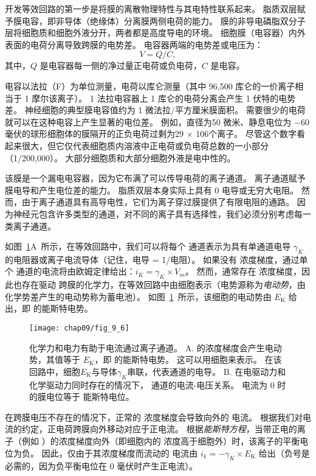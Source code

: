 开发等效回路的第一步是将膜的离散物理特性与其电特性联系起来。
脂质双层赋予膜电容，即非导体（绝缘体）分离膜两侧电荷的能力。
膜的非导电磷脂双分子层将细胞质和细胞外液分开，两者都是高度导电的环境。
细胞膜（电容器）内外表面的电荷分离导致跨膜的电势差。
电容器两端的电势差或电压为：
\begin{equation}
	V = Q/C,
\end{equation}
其中，$Q$ 是电容器每一侧的净过量正电荷或负电荷，$C$ 是电容。


电容以法拉（F）为单位测量，电荷以库仑测量（其中 96,500 库仑的一价离子相当于 1 摩尔该离子）。
1 法拉电容器上 1 库仑的电荷分离会产生 1 伏特的电势差。
神经细胞的典型膜电容值约为 1 微法拉/平方厘米膜面积。
需要很少的电荷就可以在这种电容上产生显著的电位差。 
例如，直径为50 微米、静息电位为 −60 毫伏的球形细胞体的膜隔开的正负电荷过剩为29 $\times$ 106个离子。
尽管这个数字看起来很大，但它仅代表细胞质内溶液中正电荷或负电荷总数的一小部分（1/200,000）。
大部分细胞质和大部分细胞外液是电中性的。


该膜是一个漏电电容器，因为它布满了可以传导电荷的离子通道。
离子通道赋予膜电导和产生电位差的能力。
脂质双层本身实际上具有 0 电导或无穷大电阻。
然而，由于离子通道具有高导电性，它们为离子穿过膜提供了有限电阻的通路。
因为神经元包含许多类型的通道，对不同的离子具有选择性，我们必须分别考虑每一类离子通道。


如图~\ref{fig:9_6}A~所示，在等效回路中，我们可以将每个  通道表示为具有单通道电导 $\gamma_K$ 的电阻器或离子电流导体（记住，电导 = 1/电阻）。 
如果没有  浓度梯度，通过单个  通道的电流将由欧姆定律给出：$i_K = \gamma_K \times V_m$。
然而，通常存在  浓度梯度，因此也存在驱动  跨膜的化学力，在等效回路中由细胞表示（电势源称为\textit{电动势}，由化学势差产生的电动势称为蓄电池）。
如图~\ref{fig:9_6}~所示，该细胞的电动势由 $E_\text{K}$ 给出，即  的能斯特电势。


\begin{figure}[htbp]
	\centering
	\texttt{[image: chap09/fig\_9\_6]}
	\caption{化学力和电力有助于电流通过离子通道。
		A.  的浓度梯度会产生电动势，其值等于 $E_\text{K}$，即  的能斯特电势。
		这可以用细胞来表示。
		在该回路中，细胞$E_\text{K}$与导体$\gamma_K$串联，代表通道的电导。
		B. 在电驱动力和化学驱动力同时存在的情况下， 通道的电流-电压关系。
		电流为 0 时的膜电位等于  能斯特电位。}
	\label{fig:9_6}
\end{figure}


在跨膜电压不存在的情况下，正常的  浓度梯度会导致向外的  电流。
根据我们对电流的约定，正电荷跨膜向外移动对应于正电流。
根据\textit{能斯特方程}，当带正电的离子（例如 ）的浓度梯度向外（即细胞内的  浓度高于细胞外）时，该离子的平衡电位为负。
因此，仅由于其浓度梯度而流动的  电流由 $i_k = -\gamma_K \times E_\text{K}$ 给出（负号是必需的，因为负平衡电位在 0 毫伏时产生正电流）。


